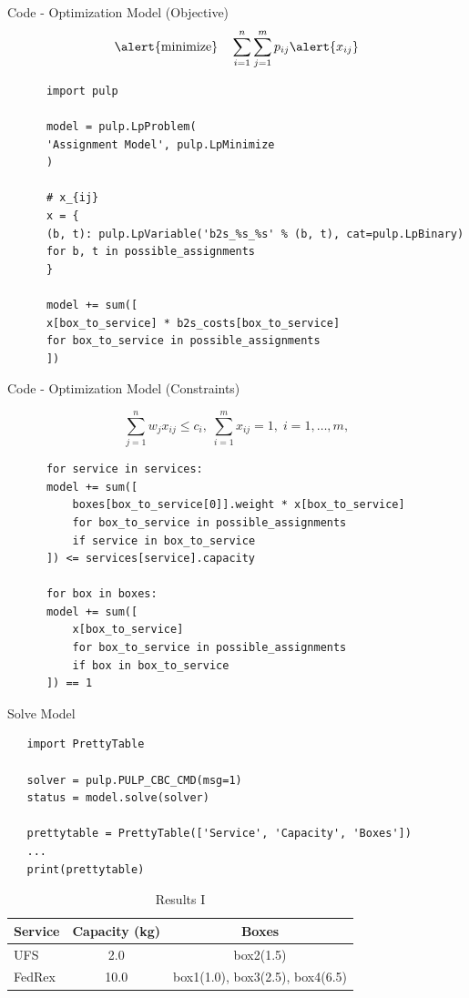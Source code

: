 \documentclass[10pt,utf8,presentation]{beamer}
\begin{document}
\begin{frame}[fragile]{Code - Optimization Model (Objective)}
  \[\text{\alert{minimize}} \quad \sum_{i=1}^{n} \sum_{j=1}^{m} p_{ij} \alert{x_{ij}}\]

  \scriptsize
  \begin{verbatim}
      import pulp
      
      model = pulp.LpProblem(
	  'Assignment Model', pulp.LpMinimize
      )
      
      # x_{ij}
      x = {
	  (b, t): pulp.LpVariable('b2s_%s_%s' % (b, t), cat=pulp.LpBinary)
	  for b, t in possible_assignments
      }
      
      model += sum([
	  x[box_to_service] * b2s_costs[box_to_service]
	  for box_to_service in possible_assignments
      ])
  \end{verbatim}
  
  
\end{frame}

\begin{frame}[fragile]{Code - Optimization Model (Constraints)}

\[ \sum_{j=1}^{n} w_j x_{ij} \leq c_i, \; \sum_{i=1}^{m} x_{ij} = 1, \; i=1, \ldots, m, \]

  \scriptsize
  \begin{verbatim}
      for service in services:
	  model += sum([
	      boxes[box_to_service[0]].weight * x[box_to_service]
	      for box_to_service in possible_assignments
	      if service in box_to_service
	  ]) <= services[service].capacity

      for box in boxes:
	  model += sum([
	      x[box_to_service]
	      for box_to_service in possible_assignments
	      if box in box_to_service
	  ]) == 1
  \end{verbatim}


\end{frame}

\begin{frame}[fragile]{Solve Model}

  \scriptsize
  \begin{verbatim}
   import PrettyTable
  
   solver = pulp.PULP_CBC_CMD(msg=1)
   status = model.solve(solver)
   
   prettytable = PrettyTable(['Service', 'Capacity', 'Boxes'])
   ...
   print(prettytable)
  \end{verbatim}

    \begin{table}

    \caption{Results I}
    \begin{tabular}{lcc}
     \toprule
     Service & Capacity (kg) & Boxes \\
     \midrule
     UFS & 2.0 & box2(1.5) \\
     FedRex & 10.0 & box1(1.0), box3(2.5), box4(6.5) \\
     \bottomrule
    \end{tabular}

  \end{table}
  
\end{frame}
\end{document}
